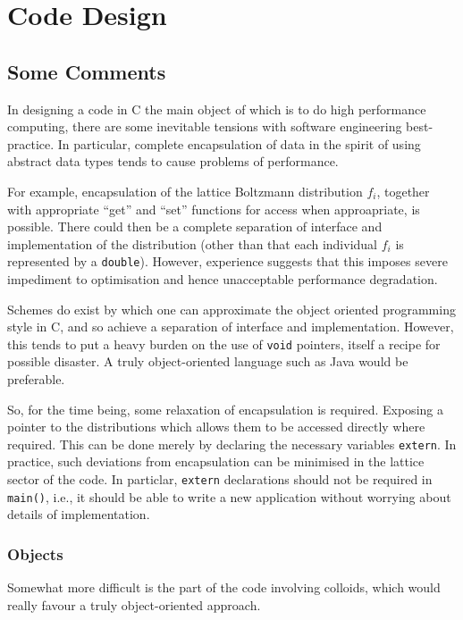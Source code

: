 \section{Code Design}

\subsection{Some Comments}

In designing a code in C the main object of which is to do high
performance computing, there are some inevitable tensions with
software engineering best-practice. In particular, complete
encapsulation of data in the spirit of using abstract data types
tends to cause problems of performance.

For example, encapsulation of the lattice Boltzmann distribution
$f_i$, together with appropriate ``get'' and ``set'' functions for
access when approapriate, is possible. There could then be a
complete separation of interface and implementation of the
distribution (other than that each individual $f_i$ is represented
by a \texttt{double}). However, experience suggests that
this imposes severe impediment to optimisation and hence
unacceptable performance degradation.

Schemes do exist by which one can approximate the object
oriented programming style in C, and so achieve a separation
of interface and implementation. However, this tends to put
a heavy burden on the use of \texttt{void} pointers, itself
a recipe for possible disaster. A truly object-oriented
language such as Java would be preferable.

So, for the time being, some relaxation of encapsulation is required.
Exposing a pointer to the distributions which allows them to be accessed
directly where required. This can be done merely by declaring the
necessary variables \texttt{extern}. In practice, such deviations
from encapsulation can be minimised in the lattice sector of the
code. In particlar, \texttt{extern} declarations should not be
required in \texttt{main()}, i.e., it should be able to write a
new application without worrying about details of implementation.

\subsubsection{Objects}

Somewhat more difficult is the part of the code involving
colloids, which would really favour a truly object-oriented
approach.

